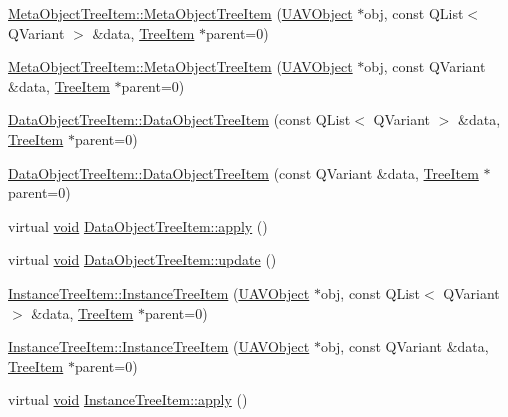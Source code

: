 \begin{DoxyCompactItemize}
\item 
\hyperlink{group___u_a_v_object_browser_plugin_gaccbd935f55017692b1051678b5f53ad8}{\-Meta\-Object\-Tree\-Item\-::\-Meta\-Object\-Tree\-Item} (\hyperlink{class_u_a_v_object}{\-U\-A\-V\-Object} $\ast$obj, const \-Q\-List$<$ \-Q\-Variant $>$ \&data, \hyperlink{class_tree_item}{\-Tree\-Item} $\ast$parent=0)
\item 
\hyperlink{group___u_a_v_object_browser_plugin_ga13e8806399befff9a6db4becc66810d7}{\-Meta\-Object\-Tree\-Item\-::\-Meta\-Object\-Tree\-Item} (\hyperlink{class_u_a_v_object}{\-U\-A\-V\-Object} $\ast$obj, const \-Q\-Variant \&data, \hyperlink{class_tree_item}{\-Tree\-Item} $\ast$parent=0)
\item 
\hyperlink{group___u_a_v_object_browser_plugin_gabc056eda5e72e5f0bebe3fd41fd5f552}{\-Data\-Object\-Tree\-Item\-::\-Data\-Object\-Tree\-Item} (const \-Q\-List$<$ \-Q\-Variant $>$ \&data, \hyperlink{class_tree_item}{\-Tree\-Item} $\ast$parent=0)
\item 
\hyperlink{group___u_a_v_object_browser_plugin_ga1a938e6bed78334aef5b0a9c4050e847}{\-Data\-Object\-Tree\-Item\-::\-Data\-Object\-Tree\-Item} (const \-Q\-Variant \&data, \hyperlink{class_tree_item}{\-Tree\-Item} $\ast$parent=0)
\item 
virtual \hyperlink{group___u_a_v_objects_plugin_ga444cf2ff3f0ecbe028adce838d373f5c}{void} \hyperlink{group___u_a_v_object_browser_plugin_gab322316ea60cf5981a289051b8d486b3}{\-Data\-Object\-Tree\-Item\-::apply} ()
\item 
virtual \hyperlink{group___u_a_v_objects_plugin_ga444cf2ff3f0ecbe028adce838d373f5c}{void} \hyperlink{group___u_a_v_object_browser_plugin_ga758265673ec0372a0dbb0ccd04d957d2}{\-Data\-Object\-Tree\-Item\-::update} ()
\item 
\hyperlink{group___u_a_v_object_browser_plugin_gabd66635c3e24281e23eada197638556f}{\-Instance\-Tree\-Item\-::\-Instance\-Tree\-Item} (\hyperlink{class_u_a_v_object}{\-U\-A\-V\-Object} $\ast$obj, const \-Q\-List$<$ \-Q\-Variant $>$ \&data, \hyperlink{class_tree_item}{\-Tree\-Item} $\ast$parent=0)
\item 
\hyperlink{group___u_a_v_object_browser_plugin_ga1bcb15718988cc4a3a33c7ff85c7c00d}{\-Instance\-Tree\-Item\-::\-Instance\-Tree\-Item} (\hyperlink{class_u_a_v_object}{\-U\-A\-V\-Object} $\ast$obj, const \-Q\-Variant \&data, \hyperlink{class_tree_item}{\-Tree\-Item} $\ast$parent=0)
\item 
virtual \hyperlink{group___u_a_v_objects_plugin_ga444cf2ff3f0ecbe028adce838d373f5c}{void} \hyperlink{group___u_a_v_object_browser_plugin_gafd9da1af77e6f69ebd81764de23cc4c0}{\-Instance\-Tree\-Item\-::apply} ()

\end{DoxyCompactItemize}
